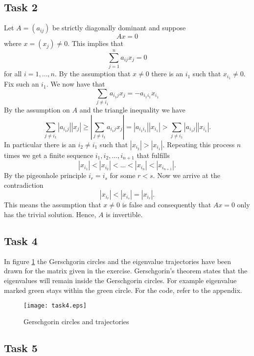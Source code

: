 \documentclass[a4paper,12pt]{article}
\begin{document}
\subsection*{Task 2}

Let \(A = (a_{ij})\) be strictly diagonally dominant and suppose
\[ Ax = 0 \]
where \(x = (x_j) \ne 0\).
This implies that
\[ \sum_{j=1}^n a_{ij} x_j = 0 \]
for all \(i = 1, \dots, n\).
By the assumption that \(x \ne 0\) there is an \(i_1\) such that
\(x_{i_1} \ne 0\).
Fix such an \(i_1\).
We now have that
\[ \sum_{j \ne i_1} a_{i_1j} x_j = -a_{i_1i_1}x_{i_1} \]
By the assumption on \(A\) and the triangle inequality we have
\[
  \sum_{j \ne i_1} |a_{i_1j}| |x_j|
    \ge \left| \sum_{j \ne i_1} a_{i_1j} x_j \right|
    = |a_{i_1i_1}| |x_{i_1}|
    > \sum_{j \ne i_1} |a_{i_1j}| |x_{i_1}|.
\]
In particular there is an \(i_2 \ne i_1\) such that \(|x_{i_2}| > |x_{i_1}|\).
Repeating this process \(n\) times we get a finite sequence
\(i_1, i_2, \dots, i_{n+1}\) that fulfills
\[ |x_{i_1}| < |x_{i_2}| < \dots < |x_{i_n}| < |x_{i_{n+1}}|. \]
By the pigeonhole principle \(i_r = i_s\) for some \(r < s\).
Now we arrive at the contradiction
\[ |x_{i_r}| < |x_{i_s}| = |x_{i_r}|. \]
This means the assumption that \(x \ne 0\) is false and consequently that
\(Ax = 0\) only has the trivial solution.
Hence, \(A\) is invertible.


\subsection*{Task 4}

In figure \ref{fig} the Gerschgorin circles and the eigenvalue trajectories have
been drawn for the matrix given in the exercise.
Gerschgorin's theorem states that the eigenvalues will remain inside the
Gerschgorin circles.
For example eigenvalue marked green stays within the green circle.
For the code, refer to the appendix.

\begin{figure}
  \centering
  \texttt{[image: task4.eps]}
  \caption{Gerschgorin circles and trajectories}
  \label{fig}
\end{figure}


\subsection*{Task 5}
\end{document}
